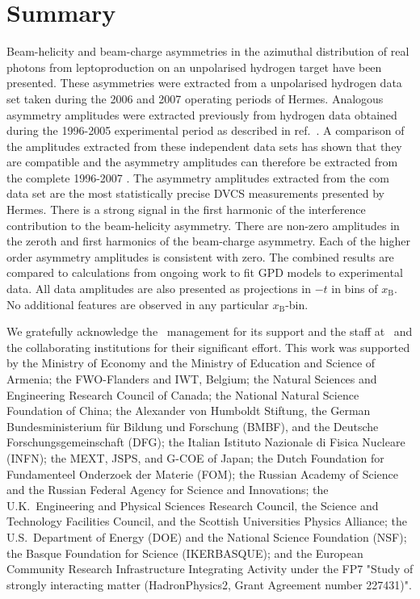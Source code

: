 \section{Summary}


Beam-helicity and beam-charge asymmetries in the azimuthal distribution of real photons from leptoproduction on an unpolarised hydrogen target have been presented. These asymmetries were extracted from a unpolarised hydrogen data set taken during the 2006 and 2007 operating periods of H{\sc ermes}. Analogous asymmetry amplitudes were extracted previously from hydrogen data obtained during the 1996-2005 experimental period as described in ref.~\cite{Air09}. A comparison of the amplitudes extracted from these independent data sets has shown that they are compatible and the asymmetry amplitudes can therefore be extracted from the complete 1996-2007 . The asymmetry amplitudes extracted from the com data set are the most statistically precise DVCS measurements presented by H{\sc ermes}. There is a strong signal in the first harmonic of the interference contribution to the beam-helicity asymmetry. There are non-zero amplitudes in the zeroth and first harmonics of the beam-charge asymmetry. Each of the higher order asymmetry amplitudes is consistent with zero. The combined results are compared to calculations from ongoing work to fit GPD models to experimental data. All data amplitudes are also presented as projections in $-t$ in bins of $x_{\textrm{B}}$. No additional features are observed in any particular $x_{\textrm{B}}$-bin.

\acknowledgments

We gratefully acknowledge the \desy\ management for its support and the staff
at \desy\ and the collaborating institutions for their significant effort.
This work was supported by 
the Ministry of Economy and the Ministry of Education and Science of Armenia;
the FWO-Flanders and IWT, Belgium;
the Natural Sciences and Engineering Research Council of Canada;
the National Natural Science Foundation of China;
the Alexander von Humboldt Stiftung,
the German Bundesministerium f\"ur Bildung und Forschung (BMBF), and
the Deutsche Forschungsgemeinschaft (DFG);
the Italian Istituto Nazionale di Fisica Nucleare (INFN);
the MEXT, JSPS, and G-COE of Japan;
the Dutch Foundation for Fundamenteel Onderzoek der Materie (FOM);
the Russian Academy of Science and the Russian Federal Agency for 
Science and Innovations;
the U.K.~Engineering and Physical Sciences Research Council, 
the Science and Technology Facilities Council,
and the Scottish Universities Physics Alliance;
the U.S.~Department of Energy (DOE) and the National Science Foundation (NSF);
the Basque Foundation for Science (IKERBASQUE);
and the European Community Research Infrastructure Integrating Activity
under the FP7 "Study of strongly interacting matter (HadronPhysics2, Grant
Agreement number 227431)".


